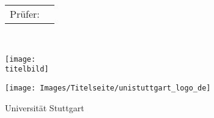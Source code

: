 \begin{titlepage}
\begin{minipage}[c]{105mm}
		\vspace{5mm}
		\hspace{-3.0mm} 
		\begin{tabular}{p{2.5cm}l}
			\fontsize{12}{20}\textsf{Prüfer:}&\textsf{\pruefer}	\\
		\end{tabular}
		
		\vspace{11mm}
		\fontsize{12}{20}\textsf{\EndeMonatTxt~\EndeJahr}
		
		
		\begin{minipage}[t][10.5cm][c]{\textwidth}
			\texttt{[image: \\titelbild]}
		\end{minipage}
		
		
		\begin{minipage}[c]{12mm}
			\vspace{-1mm}
			\texttt{[image: Images/Titelseite/unistuttgart\_logo\_de]}
		\end{minipage}
		\begin{minipage}[c]{60mm}
			\fontsize{12}{20}\textsf{Universität Stuttgart}
		\end{minipage}
		
		\fontsize{12}{20}
		\vspace{3mm}
		\textsf{\institut} \\
		\textsf{\profEins} \\
		\textsf{\profZwei} \\
		\textsf{\profDrei} 
		
	\end{minipage}
	\cleardoublepage
\end{titlepage}
